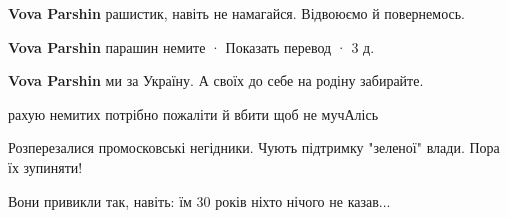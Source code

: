 \begin{itemize}
\begin{itemize}
 
\textbf{Vova Parshin} рашистик, навіть не намагайся. Відвоюємо й повернемось.

 
\textbf{Vova Parshin} парашин немите
 · Показать перевод · 3 д.
 
\textbf{Vova Parshin} ми за Україну. А своїх до себе на родіну забирайте.
\end{itemize}

 
рахую немитих потрібно пожаліти й вбити щоб не мучАлісь

 
Розперезалися промосковські негідники. Чують підтримку "зеленої" влади. Пора їх зупиняти!

 
Вони привикли так, навіть: їм 30 років ніхто нічого не казав...

 

\end{itemize}
